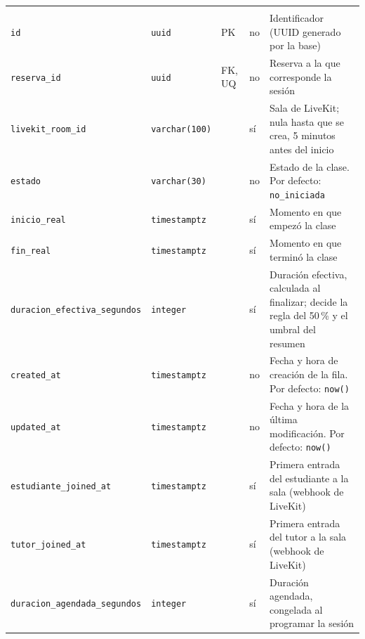 {\small
\begin{xltabular}{\textwidth}{@{}>{\raggedright\arraybackslash}p{3.6cm} >{\raggedright\arraybackslash}p{2.3cm} >{\raggedright\arraybackslash}p{1cm} >{\centering\arraybackslash}p{0.85cm} L@{}}
    \toprule
     &  &  &  &  \\
    \midrule
    \endfirsthead
    \toprule
     &  &  &  &  \\
    \midrule
    \endhead
    \bottomrule
    \endfoot
    \texttt{id} & \texttt{uuid} & PK & no & Identificador (UUID generado por la base) \\
    \texttt{reserva\_\allowbreak{}id} & \texttt{uuid} & FK, UQ & no & Reserva a la que corresponde la sesión \\
    \texttt{livekit\_\allowbreak{}room\_\allowbreak{}id} & \texttt{varchar(\allowbreak{}100)} &  & sí & Sala de LiveKit; nula hasta que se crea, 5 minutos antes del inicio \\
    \texttt{estado} & \texttt{varchar(\allowbreak{}30)} &  & no & Estado de la clase. Por defecto: \texttt{\textquotesingle{}no\_\allowbreak{}iniciada\textquotesingle{}} \\
    \texttt{inicio\_\allowbreak{}real} & \texttt{timestamptz} &  & sí & Momento en que empezó la clase \\
    \texttt{fin\_\allowbreak{}real} & \texttt{timestamptz} &  & sí & Momento en que terminó la clase \\
    \texttt{duracion\_\allowbreak{}efectiva\_\allowbreak{}segundos} & \texttt{integer} &  & sí & Duración efectiva, calculada al finalizar; decide la regla del 50\,\% y el umbral del resumen \\
    \texttt{created\_\allowbreak{}at} & \texttt{timestamptz} &  & no & Fecha y hora de creación de la fila. Por defecto: \texttt{now(\allowbreak{})} \\
    \texttt{updated\_\allowbreak{}at} & \texttt{timestamptz} &  & no & Fecha y hora de la última modificación. Por defecto: \texttt{now(\allowbreak{})} \\
    \texttt{estudiante\_\allowbreak{}joined\_\allowbreak{}at} & \texttt{timestamptz} &  & sí & Primera entrada del estudiante a la sala (webhook de LiveKit) \\
    \texttt{tutor\_\allowbreak{}joined\_\allowbreak{}at} & \texttt{timestamptz} &  & sí & Primera entrada del tutor a la sala (webhook de LiveKit) \\
    \texttt{duracion\_\allowbreak{}agendada\_\allowbreak{}segundos} & \texttt{integer} &  & sí & Duración agendada, congelada al programar la sesión \\

\end{xltabular}}

